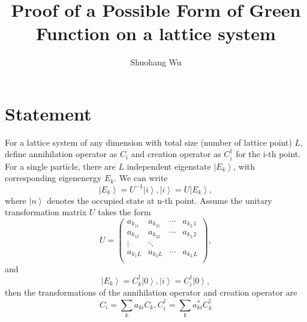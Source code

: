 \documentclass[prb,superscriptaddress,letter,10pt,onecolumn]{revtex4}
\begin{document}
\title{Proof of a Possible Form of Green Function on a lattice system}
\author{Shuohang Wu}

\maketitle

\section{Statement}

For a lattice system of any dimension with total size (number of lattice point) $L$, define annihilation operator as $C_i$ and creation operator as $C_i^\dagger$ for the i-th point.
For a single particle, there are $L$ independent eigenstate $\left|E_k\right>$, with corresponding eigenenergy $E_k$.
We can write
\begin{equation}
	\left|E_k\right> = U^{-1}\left|i\right>,
	\left|i\right> = U\left|E_k\right>,
\end{equation}
where $\left|n\right>$ denotes the occupied state at n-th point.
Assume the unitary transformation matrix $U$ takes the form
\begin{equation}
	U =       	
	\left(                 	
	\begin{array}{cccc}   		
		a_{k_11} & a_{k_21} & \cdots & a_{k_L1}\\  		
		a_{k_12} & a_{k_22} & \cdots & a_{k_L2}\\
		\vdots & \ddots &  & \\
		a_{k_1L} & a_{k_2L} & \cdots & a_{k_LL}\\  		
	\end{array}	
	\right),         	
\end{equation}
and
\begin{equation}
	\left|E_k\right> = C_k^\dagger\left|0\right>,
	\left|i\right> = C_i^\dagger\left|0\right>,
\end{equation}
then the transformations of the annihilation operator and creation operator are
\begin{equation}
	C_i = \sum_{k}a_{ki} C_k,
	C_i^\dagger = \sum_{k}a_{ki}^* C_k^\dagger
\end{equation}
\end{document}
